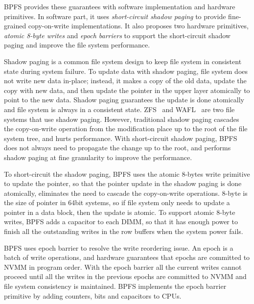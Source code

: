 BPFS provides these guarantees with software implementation and hardware
primitives. In software part, it uses \emph{short-circuit shadow paging}
to provide fine-grained copy-on-write implementations. It also proposes
two hardware primitives, \emph{atomic 8-byte writes} and \emph{epoch barriers}
to support the short-circuit shadow paging and improve the file system
performance.

Shadow paging is a common file system design to keep file system in consistent
state during system failure. To update data with shadow paging, file system
does not write new data in-place; instead, it makes a copy of the old data,
update the copy with new data, and then update the pointer in the upper layer
atomically to point to the new data. Shadow paging guarantees the update is done
atomically and file system is always in a consistent state.
 ZFS~\cite{zfs} and WAFL~\cite{wafl} are two file
systems that use shadow paging. However, traditional shadow paging cascades
the copy-on-write operation from the modification place up to the root of 
the file system tree, and hurts performance. With short-circuit shadow paging,
BPFS does not always need to propagate the change up to the root, and performs
shadow paging at fine granularity to improve the performance.

To short-circuit the shadow paging, BPFS uses the atomic 8-bytes write primitive
to update the pointer, so that the pointer update in the shadow paging is done
atomically, eliminates the need to cascade the copy-on-write operations.
8-byte is the size of pointer in 64bit systems, so if file system only needs to
update a pointer in a data block, then the update is atomic. To support
atomic 8-byte writes, BPFS adds a capacitor to each DIMM, so that it has enough
power to finish all the outstanding writes in the row buffers when the system
power fails.

 BPFS uses
epoch barrier to resolve the write reordering issue. 
An epoch is a batch of write operations,
and hardware guarantees that epochs are committed to NVMM in program order.
With the epoch barrier all the current writes cannot proceed until all the
writes in the previous epochs are committed to NVMM and file system consistency
is maintained. BPFS implements the epoch barrier primitive by adding counters,
bits and capacitors to CPUs.

